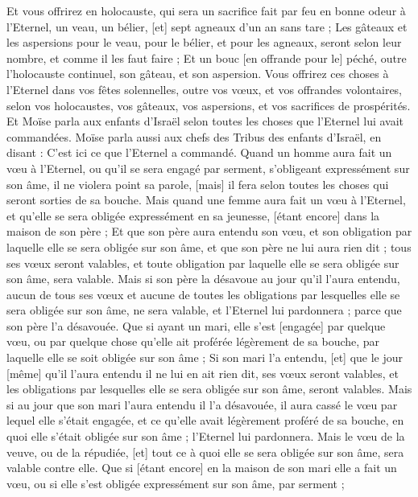 \begin{multicols}{2}
Et vous offrirez en holocauste, qui sera un sacrifice fait par feu en bonne odeur à l'Eternel, un veau, un bélier, [et] sept agneaux d'un an sans tare ;
Les gâteaux et les aspersions pour le veau, pour le bélier, et pour les agneaux, seront selon leur nombre, et comme il les faut faire ;
Et un bouc [en offrande pour le] péché, outre l'holocauste continuel, son gâteau, et son aspersion.
Vous offrirez ces choses à l'Eternel dans vos fêtes solennelles, outre vos vœux, et vos offrandes volontaires, selon vos holocaustes, vos gâteaux, vos aspersions, et vos sacrifices de prospérités.
\VerseOne{}Et Moïse parla aux enfants d'Israël selon toutes les choses que l'Eternel lui avait commandées.
Moïse parla aussi aux chefs des Tribus des enfants d'Israël, en disant : C'est ici ce que l'Eternel a commandé.
Quand un homme aura fait un vœu à l'Eternel, ou qu'il se sera engagé par serment, s'obligeant expressément sur son âme, il ne violera point sa parole, [mais] il fera selon toutes les choses qui seront sorties de sa bouche.
Mais quand une femme aura fait un vœu à l'Eternel, et qu'elle se sera obligée expressément en sa jeunesse, [étant encore] dans la maison de son père ;
Et que son père aura entendu son vœu, et son obligation par laquelle elle se sera obligée sur son âme, et que son père ne lui aura rien dit ; tous ses vœux seront valables, et toute obligation par laquelle elle se sera obligée sur son âme, sera valable.
Mais si son père la désavoue au jour qu'il l'aura entendu, aucun de tous ses vœux et aucune de toutes les obligations par lesquelles elle se sera obligée sur son âme, ne sera valable, et l'Eternel lui pardonnera ; parce que son père l'a désavouée.
Que si ayant un mari, elle s'est [engagée] par quelque vœu, ou par quelque chose qu'elle ait proférée légèrement de sa bouche, par laquelle elle se soit obligée sur son âme ;
Si son mari l'a entendu, [et] que le jour [même] qu'il l'aura entendu il ne lui en ait rien dit, ses vœux seront valables, et les obligations par lesquelles elle se sera obligée sur son âme, seront valables.
Mais si au jour que son mari l'aura entendu il l'a désavouée, il aura cassé le vœu par lequel elle s'était engagée, et ce qu'elle avait légèrement proféré de sa bouche, en quoi elle s'était obligée sur son âme ; l'Eternel lui pardonnera.
Mais le vœu de la veuve, ou de la répudiée, [et] tout ce à quoi elle se sera obligée sur son âme, sera valable contre elle.
Que si [étant encore] en la maison de son mari elle a fait un vœu, ou si elle s'est obligée expressément sur son âme, par serment ;

\end{multicols}
